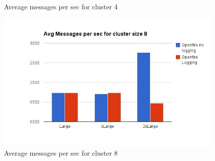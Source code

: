 \documentclass[a4paper, twocolumn]{article}
\begin{document}
\begin{figure}[ht]
\begin{minipage}[b]{0.5\linewidth}
    \caption{Average messages per sec  for cluster 4} 
  \end{minipage}
  \hfill
  \begin{minipage}[b]{0.5\linewidth}
    \includegraphics[width=0.9\linewidth]{image__15_.png} 
    \caption{Average messages per sec  for cluster 8} 
  \end{minipage} 
\end{figure}
\end{document}
